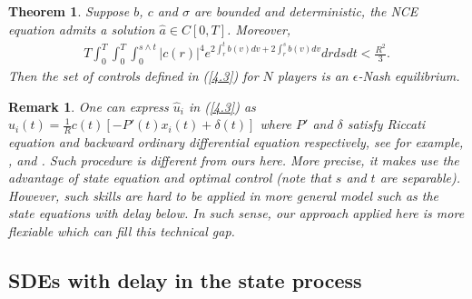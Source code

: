 \documentclass[11pt]{article}
\newtheorem{theorem}{Theorem}[section]
\newtheorem{remark}{Remark}[section]
\begin{document}
\begin{theorem}\label{theorem4-2}
Suppose $b$, $c$ and $\sigma$ are bounded and deterministic, the NCE
equation admits a solution $\widehat{a}\in C[0,T]$. Moreover,
%
\begin{eqnarray*}
T\int_{0}^{T}\int_{0}^{T}\int_{0}^{s\wedge t}|c(r)|^4e^{2\int_r^tb(v)dv+2\int_r^sb(v)dv}drdsdt<\frac{R^{2}}{3}.
\end{eqnarray*}
%
Then the set of controls defined in (\ref{4.3}) for $N$ players is
an $\epsilon$-Nash equilibrium.
\end{theorem}

\begin{remark}
One can express $\widehat{u}_i$ in (\ref{4.3}) as
$\widehat{u}_i(t)=\frac 1 R c(t)[-P'(t)x_i(t)+\delta(t)]$ where $P'$
and $\delta$ satisfy Riccati equation and backward ordinary
differential equation respectively, see for example, \cite{H 2010},
\cite{H-C-M 2007} and \cite{N-H 2012}. Such procedure is different
from ours here. More precise, it makes use the advantage of state equation and optimal control (note that $s$ and $t$ are separable). However, such skills are hard to be
applied in more general model such as the state equations with delay
below. In such sense, our approach applied here is more flexiable
which can fill this technical gap.
\end{remark}


\subsection{SDEs with delay in the state process}
\end{document}
